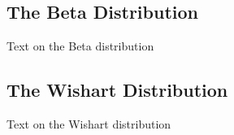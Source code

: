 \documentclass[12pt]{article}
\begin{document}
\pagebreak
\subsection{The Beta Distribution}
Text on the Beta distribution


\pagebreak
\subsection{The Wishart Distribution}
Text on the Wishart distribution

\pagebreak

\begin{appendix}
\listoffigures
{}\listoftables
\end{appendix}

\pagebreak{}\printbibliography[heading=bibintoc,title={References}]
\end{document}
